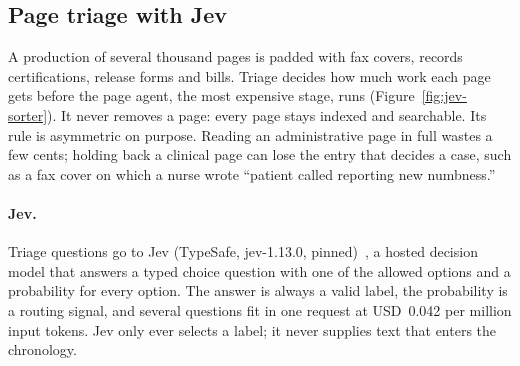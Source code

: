 \subsection{Page triage with Jev}
\label{sec:jev-triage}
A production of several thousand pages is padded with fax covers, records
certifications, release forms and bills. Triage decides how much work each
page gets before the page agent, the most expensive stage, runs
(Figure~\ref{fig:jev-sorter}). It never removes a page: every page stays
indexed and searchable. Its rule is asymmetric on purpose. Reading an
administrative page in full wastes a few cents; holding back a clinical
page can lose the entry that decides a case, such as a fax cover on which
a nurse wrote ``patient called reporting new numbness.''

\paragraph{Jev.} Triage questions go to Jev (TypeSafe, jev-1.13.0,
pinned)~\cite{typesafe2026jev}, a hosted decision model that answers a
typed choice question with one of the allowed options and a probability
for every option. The answer is always a valid label, the probability is a
routing signal, and several questions fit in one request at
USD~0.042 per million input tokens. Jev only ever selects a label; it never
supplies text that enters the chronology.

